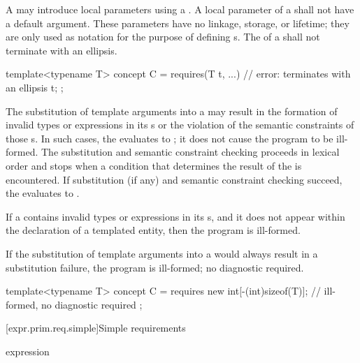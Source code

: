 \pnum
A  may introduce local parameters using a
.
A local parameter of a  shall not have a
default argument.
These parameters have no linkage, storage, or lifetime; they are only used
as notation for the purpose of defining s.
The  of a
shall not terminate with an ellipsis.
\begin{example}
\begin{codeblock}
template<typename T>
concept C = requires(T t, ...) {    // error: terminates with an ellipsis
  t;
};
\end{codeblock}
\end{example}

\pnum
The substitution of template arguments into a 
may result in the formation of invalid types or expressions in its
s or the violation of the semantic constraints of those s.
In such cases, the  evaluates to ;
it does not cause the program to be ill-formed.
The substitution and semantic constraint checking
proceeds in lexical order and stops when a condition that
determines the result of the  is encountered.
If substitution (if any) and semantic constraint checking succeed,
the  evaluates to .
\begin{note}
If a  contains invalid types or expressions in
its s, and it does not appear within the declaration of a templated
entity, then the program is ill-formed.
\end{note}
If the substitution of template arguments into a 
would always result in a substitution failure, the program is ill-formed;
no diagnostic required.
\begin{example}
\begin{codeblock}
template<typename T> concept C =
requires {
  new int[-(int)sizeof(T)];     // ill-formed, no diagnostic required
};
\end{codeblock}
\end{example}

[expr.prim.req.simple]{Simple requirements}
%

\begin{bnf}
\br
    expression \terminal{;}
\end{bnf}

